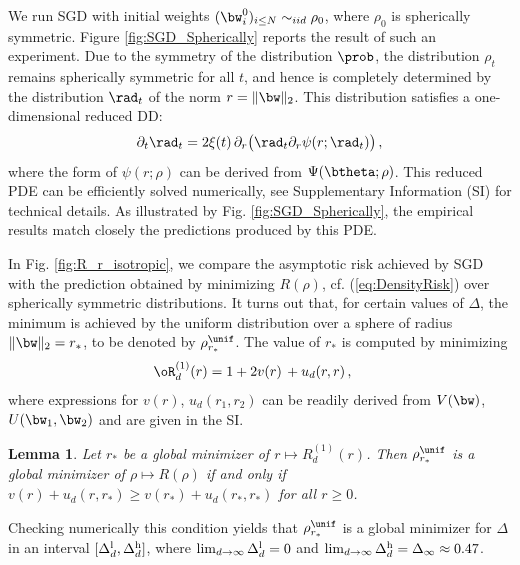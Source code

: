 \documentclass[11pt]{article}
\newtheorem{lemma}{Lemma}
\renewcommand{\eqref}[1]{(\ref{#1})}
\begin{document}
We run SGD  with initial weights $(\bw^0_i)_{i\le N}\sim_{iid} \rho_0$, where $\rho_0$ is spherically symmetric. 
Figure \ref{fig:SGD_Spherically} reports the result of such an experiment.
Due to the symmetry of the distribution $\prob$, the distribution $\rho_t$ remains spherically symmetric for all $t$,
and hence is completely determined by the distribution $\rad_t$ of the norm $r = \|\bw\|_2$. This distribution satisfies
a one-dimensional reduced DD:
%
\begin{align}
%
\partial_t\rad_t = 2\xi(t)\, \partial_r\big(\rad_t\partial_r \psi(r;\rad_t)\big)\,,\label{eq:ReducedPDE}
%
\end{align}
%
where the form of $\psi(r;\rho)$ can be derived from $\Psi(\btheta;\rho)$.
This reduced PDE can be efficiently solved numerically, see Supplementary Information (SI) for technical details.
As illustrated by Fig. \ref{fig:SGD_Spherically}, the empirical results match closely the predictions produced by this PDE.

In Fig. \ref{fig:R_r_isotropic}, we compare the asymptotic risk achieved by SGD with the prediction obtained by minimizing
$R(\rho)$, cf. \eqref{eq:DensityRisk} over spherically symmetric distributions. It turns out that, for certain values of  $\Delta$, the minimum 
is achieved by the uniform distribution over a sphere of radius $\|\bw\|_2 = r_*$, to be denoted by $\rho^{\unif}_{r_*}$. The value of $r_*$ is computed by minimizing 
%
\begin{align}
\oR^{(1)}_d(r) &= 1+2 v(r) \,+ u_d(r,r)\, ,\label{eq:Isotropic}
\end{align}
%
where  expressions for $v(r)$, $u_d(r_1,r_2)$ can be readily derived from $V(\bw)$, $U(\bw_1,\bw_2)$ 
and are given in the SI.
%
\begin{lemma}\label{lemma:OneDeltaCondition}
Let $r_*$ be a global minimizer of $r\mapsto R_d^{(1)}(r)$. Then $\rho^{\unif}_{r_*}$ is a global minimizer of $\rho\mapsto R(\rho)$ if and only if  $v(r)+u_d(r,r_*)\ge v(r_*)+u_d(r_*,r_*)$
for all $r\ge 0$.
\end{lemma}
%
Checking numerically this condition yields that $\rho^{\unif}_{r_*}$ is a global minimizer
for $\Delta$ in an interval $[\Delta^{\rm l}_d,\Delta^{\rm h}_d]$, where 
$\lim_{d\to\infty}\Delta^{\rm l}_d=0$ and $\lim_{d\to\infty}\Delta^{\rm h}_d=\Delta_\infty \approx 0.47$. 
%
\end{document}
